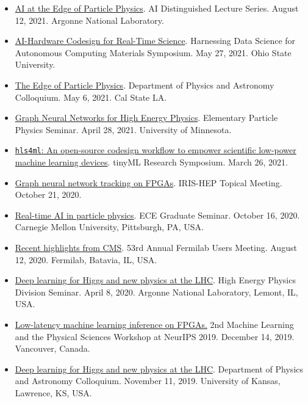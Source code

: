 \documentclass[11pt]{res}
\begin{document}
\begin{resume}
\begin{itemize}
    \item \href{https://www.anl.gov/event/ai-at-the-edge-of-particle-physics}{AI at the Edge of Particle Physics}. AI Distinguished Lecture Series. August 12, 2021. Argonne National Laboratory.
    \item \href{https://tdai.osu.edu/events/acm-symposium-harnessing-data-science-autonomous-computing-materials}{AI-Hardware Codesign for Real-Time Science}. Harnessing Data Science for Autonomous Computing Materials Symposium. May 27, 2021. Ohio State University.
    \item \href{https://www.calstatela.edu/dept/physics/colloquia-and-events}{The Edge of Particle Physics}. Department of Physics and Astronomy Colloquium. May 6, 2021. Cal State LA.
    \item \href{https://cse.umn.edu/physics/elementary-particle-physics-elem-part-phys-seminar}{Graph Neural Networks for High Energy Physics}. Elementary Particle Physics Seminar. April 28, 2021. University of Minnesota.
    \item \href{https://www.tinyml.org/event/research-symposium-2021/}{\texttt{hls4ml}: An open-source codesign workflow to empower scientific low-power machine learning devices}. tinyML Research Symposium. March 26, 2021.
    \item \href{https://indico.cern.ch/event/955026/}{Graph neural network tracking on FPGAs}. IRIS-HEP Topical Meeting. October 21, 2020.
    \item \href{https://www.cs.cmu.edu/calendar/fri-2020-10-16-1200/ece-graduate-seminar}{Real-time AI in particle physics}. ECE Graduate Seminar. October 16, 2020. Carnegie Mellon University, Pittsburgh, PA, USA.
    \item \href{https://indico.fnal.gov/event/23109/contributions/193292/}{Recent highlights from CMS}. 53rd Annual Fermilab Users Meeting. August 12, 2020. Fermilab, Batavia, IL, USA.
    \item \href{https://indico.fnal.gov/event/22961/}{Deep learning for Higgs and new physics at the LHC}. High Energy Physics Division Seminar. April 8, 2020. Argonne National Laboratory, Lemont, IL, USA.
    \item \href{https://ml4physicalsciences.github.io/2019/files/NeurIPS_ML4PS_2019_74.pdf}{Low-latency machine learning inference on FPGAs.} 2nd Machine Learning and the Physical Sciences Workshop at NeurIPS 2019.  December 14, 2019. Vancouver, Canada.
    \item \href{https://physics.drupal.ku.edu/calendar/colloquia#/?i=2}{Deep learning for Higgs and new physics at the LHC}. Department of Physics and Astronomy Colloquium. November 11, 2019. University of Kansas, Lawrence, KS, USA.

\end{itemize}
\end{resume}
\end{document}
